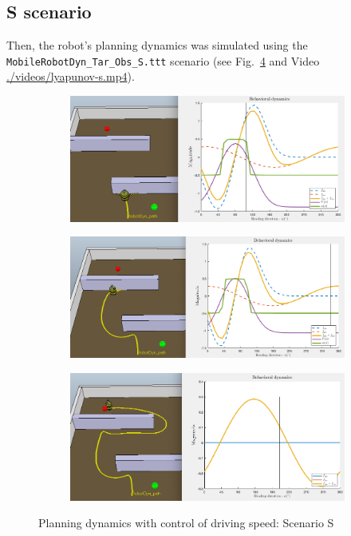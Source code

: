 \subsection{S scenario}%
\label{sec:s-scenario-lyapunov}
Then, the robot's planning dynamics was simulated using the
\texttt{MobileRobotDyn\_Tar\_Obs\_S.ttt} scenario (see Fig.~\ref{fig:lyapunov-s}
and Video \href{run:./videos/lyapunov-s.mp4}{./videos/lyapunov-s.mp4}). 
%
\begin{figure}[htb!]
  \centering
%
  \begin{subfigure}{.7\textwidth}
    \includegraphics[width=\textwidth]{img/lyapunov-s-1.PNG}%
  \caption{}%
  \label{fig:lyapunov-s-1}
  \end{subfigure}
%
  \begin{subfigure}{.7\textwidth}
    \includegraphics[width=\textwidth]{img/lyapunov-s-2.PNG}%
  \caption{}%
  \label{fig:lyapunov-s-2}
  \end{subfigure} 
  \begin{subfigure}{.7\textwidth}
    \includegraphics[width=\textwidth]{img/lyapunov-s-3.PNG}%
  \caption{}%
  \label{fig:lyapunov-s-3}
  \end{subfigure}
%
  \caption{Planning dynamics with control of driving speed: Scenario S}%
  \label{fig:lyapunov-s}
\end{figure}
